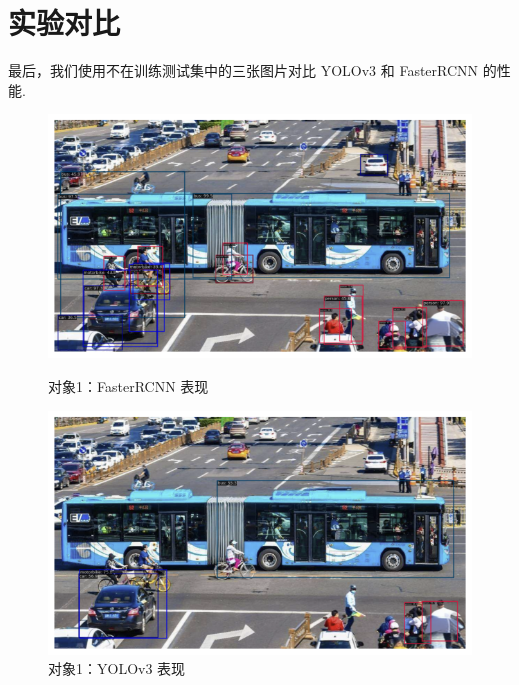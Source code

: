 \documentclass[notitlepage,cs4size,punct,oneside]{ctexrep}
\numberwithin{equation}{chapter}
\theoremstyle{mystyle}
\begin{document}
\section{实验对比}

最后，我们使用不在训练测试集中的三张图片对比 YOLOv3 和 FasterRCNN 的性能.

\begin{figure}[!htpb]
    \centering
    \begin{minipage}[t]{0.49\textwidth}
    \includegraphics[width=\linewidth]{cnntest1.png}
    \caption{对象1：FasterRCNN 表现}
    \label{mAPfrcnn}
    \end{minipage}
    \begin{minipage}[t]{0.49\textwidth}
    \includegraphics[width=\linewidth]{yolotest1.png}
    \caption{对象1：YOLOv3 表现}
    \label{frcnn_loss}
    \end{minipage}
\end{figure}
\end{document}
